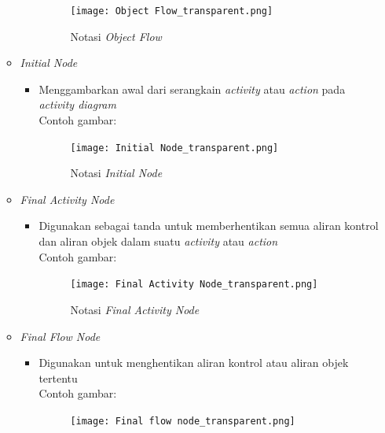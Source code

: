 \documentclass[a4paper]{article}
\begin{document}
\begin{enumerate}
\begin{itemize}
\begin{itemize}
\begin{figure}[h]
                    \texttt{[image: Object Flow\_transparent.png]}
                    \caption{Notasi \textit{Object Flow}}
                  \end{figure}
        \end{itemize}
        \item \textit{Initial Node}
        \begin{itemize}
            \item Menggambarkan awal dari serangkain \textit{activity} atau \textit{action} pada \textit{activity diagram}\autocite{systemanalysisdesign-activity-diagram}\\
                  Contoh gambar:\\
                  \begin{figure}[h]
                    \centering
                    \texttt{[image: Initial Node\_transparent.png]}
                    \caption{Notasi \textit{Initial Node}}
                  \end{figure}
        \end{itemize}
        \newpage
        \item \textit{Final Activity Node}
        \begin{itemize}
            \item Digunakan sebagai tanda untuk memberhentikan semua aliran kontrol dan aliran objek dalam suatu \textit{activity} atau \textit{action}\autocite{systemanalysisdesign-activity-diagram}\\
                  Contoh gambar:\\
                  \begin{figure}[h]
                    \centering
                    \texttt{[image: Final Activity Node\_transparent.png]}
                    \caption{Notasi \textit{Final Activity Node}}
                  \end{figure}
        \end{itemize}
        \item \textit{Final Flow Node}
        \begin{itemize}
            \item Digunakan untuk menghentikan aliran kontrol atau aliran objek tertentu\autocite{systemanalysisdesign-activity-diagram}\\
                  Contoh gambar:\\
                  \begin{figure}[h]
                    \centering
                    \texttt{[image: Final flow node\_transparent.png]}

\end{figure}
\end{itemize}
\end{itemize}
\end{enumerate}
\end{document}
